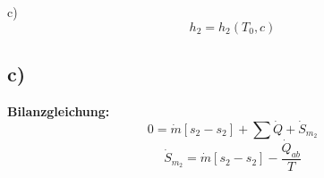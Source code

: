 c)
\]
\[
h_2 = h_2 (T_0,

c)
\]



\subsection*{c)}
\textbf{Bilanzgleichung:}
\[
0 = \dot{m} [s_2 - s_2] + \sum \dot{Q} + \dot{S}_{m_2}
\]
\[
\dot{S}_{m_2} = \dot{m} [s_2 - s_2] - \frac{\dot{Q}_{ab}}{T}
\]